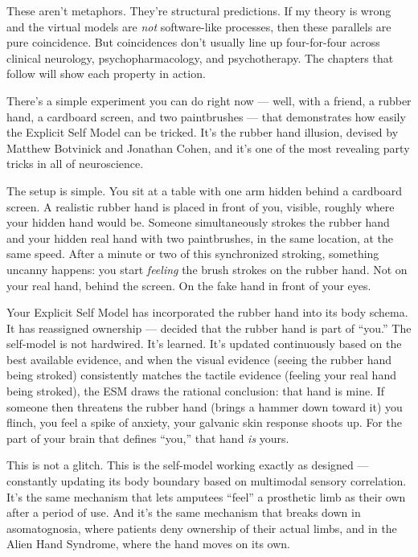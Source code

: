 \documentclass[11pt, twoside, openright]{book}
\begin{document}
These aren't metaphors. They're structural predictions. If my theory is wrong and the virtual models are \textit{not} software-like processes, then these parallels are pure coincidence. But coincidences don't usually line up four-for-four across clinical neurology, psychopharmacology, and psychotherapy. The chapters that follow will show each property in action.

There's a simple experiment you can do right now --- well, with a friend, a rubber hand, a cardboard screen, and two paintbrushes --- that demonstrates how easily the Explicit Self Model can be tricked. It's the rubber hand illusion, devised by Matthew Botvinick and Jonathan Cohen, and it's one of the most revealing party tricks in all of neuroscience.

The setup is simple. You sit at a table with one arm hidden behind a cardboard screen. A realistic rubber hand is placed in front of you, visible, roughly where your hidden hand would be. Someone simultaneously strokes the rubber hand and your hidden real hand with two paintbrushes, in the same location, at the same speed. After a minute or two of this synchronized stroking, something uncanny happens: you start \textit{feeling} the brush strokes on the rubber hand. Not on your real hand, behind the screen. On the fake hand in front of your eyes.

Your Explicit Self Model has incorporated the rubber hand into its body schema. It has reassigned ownership --- decided that the rubber hand is part of ``you.'' The self-model is not hardwired. It's learned. It's updated continuously based on the best available evidence, and when the visual evidence (seeing the rubber hand being stroked) consistently matches the tactile evidence (feeling your real hand being stroked), the ESM draws the rational conclusion: that hand is mine. If someone then threatens the rubber hand (brings a hammer down toward it) you flinch, you feel a spike of anxiety, your galvanic skin response shoots up. For the part of your brain that defines ``you,'' that hand \textit{is} yours.

This is not a glitch. This is the self-model working exactly as designed --- constantly updating its body boundary based on multimodal sensory correlation. It's the same mechanism that lets amputees ``feel'' a prosthetic limb as their own after a period of use. And it's the same mechanism that breaks down in asomatognosia, where patients deny ownership of their actual limbs, and in the Alien Hand Syndrome, where the hand moves on its own.
\end{document}
